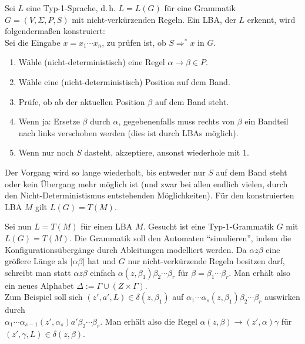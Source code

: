 \begin{Beweis}
    Sei $L$ eine Typ-1-Sprache, d.\,h. $L = L(G)$ für eine Grammatik
    $G = (V, \Sigma, P, S)$ mit nicht-verkürzenden Regeln.
    Ein LBA, der $L$ erkennt, wird folgendermaßen konstruiert:\\
    Sei die Eingabe $x = x_1 \dotsb x_n$, zu prüfen ist, ob
    $S \Rightarrow^\ast x$ in $G$.
    \begin{enumerate}
        \item
        Wähle (nicht-deterministisch) eine Regel
        $\alpha \rightarrow \beta \in P$.
        
        \item
        Wähle eine (nicht-deterministisch) Position auf dem Band.
        
        \item
        Prüfe, ob ab der aktuellen Position $\beta$ auf dem Band steht.
        
        \item
        Wenn ja: Ersetze $\beta$ durch $\alpha$,
        gegebenenfalls muss rechts von $\beta$ ein Bandteil nach links
        verschoben werden (dies ist durch LBAs möglich).
        
        \item
        Wenn nur noch $S$ dasteht, akzeptiere, ansonst wiederhole mit 1.
    \end{enumerate}
    Der Vorgang wird so lange wiederholt, bis entweder nur $S$ auf dem
    Band steht oder kein Übergang mehr möglich ist
    (und zwar bei allen endlich vielen, durch den
    Nicht-Deterministismus entstehenden Möglichkeiten).
    Für den konstruierten LBA $M$ gilt $L(G) = T(M)$.
    
    Sei nun $L = T(M)$ für einen LBA $M$.
    Gesucht ist eine Typ-1-Grammatik $G$ mit $L(G) = T(M)$.
    Die Grammatik soll den Automaten "`simulieren"', indem die
    Konfigurationsübergänge durch Ableitungen modelliert werden.
    Da $\alpha z \beta$ eine größere Länge als $|\alpha \beta|$ hat und
    $G$ nur nicht-verkürzende Regeln besitzen darf,
    schreibt man statt $\alpha z \beta$ einfach
    $\alpha (z, \beta_1) \beta_2 \dotsb \beta_r$ für
    $\beta = \beta_1 \dotsb \beta_r$.
    Man erhält also ein neues Alphabet
    $\Delta := \Gamma \cup (Z \times \Gamma)$.\\
    Zum Beispiel soll sich $(z', a', L) \in \delta(z, \beta_1)$
    auf $\alpha_1 \dotsb \alpha_s (z, \beta_1) \beta_2 \dotsb \beta_r$
    auswirken durch\\
    $\alpha_1 \dotsb \alpha_{s-1} (z', \alpha_s) a' \beta_2 \dotsb \beta_r$.
    Man erhält also die Regel
    $\alpha (z, \beta) \rightarrow (z', \alpha) \gamma$
    für $(z', \gamma, L) \in \delta(z, \beta)$.
    

\end{Beweis}
